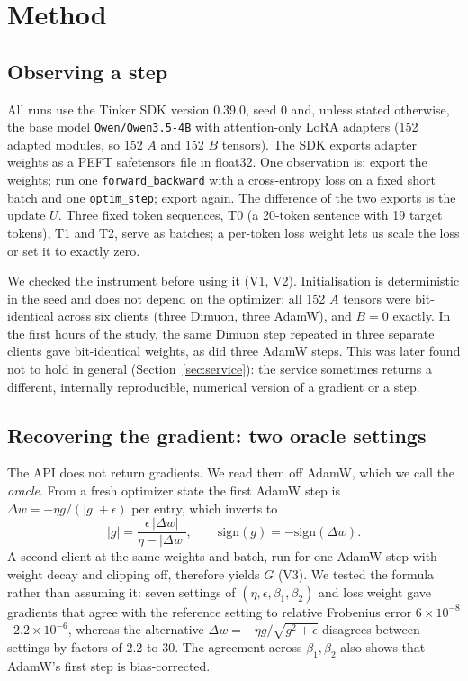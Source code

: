 \documentclass[11pt]{article}
\begin{document}
\section{Method}\label{sec:method}

\subsection{Observing a step}
All runs use the Tinker SDK version 0.39.0, seed 0 and, unless stated otherwise, the base model
\texttt{Qwen/Qwen3.5-4B} with attention-only LoRA adapters (152 adapted modules, so 152 $A$ and 152
$B$ tensors). The SDK exports adapter weights as a PEFT safetensors file in float32. One observation
is: export the weights; run one \texttt{forward\_backward} with a cross-entropy loss on a fixed
short batch and one \texttt{optim\_step}; export again. The difference of the two exports is the
update $U$. Three fixed token sequences, T0 (a 20-token sentence with 19 target tokens), T1 and T2,
serve as batches; a per-token loss weight lets us scale the loss or set it to exactly zero.

We checked the instrument before using it (V1, V2). Initialisation is deterministic in the seed and
does not depend on the optimizer: all 152 $A$ tensors were bit-identical across six clients (three
Dimuon, three AdamW), and $B=0$ exactly. In the first hours of the study, the same Dimuon step
repeated in three separate clients gave bit-identical weights, as did three AdamW steps. This was
later found not to hold in general (Section~\ref{sec:service}): the service sometimes returns a
different, internally reproducible, numerical version of a gradient or a step.

\subsection{Recovering the gradient: two oracle settings}\label{sec:oracle}
The API does not return gradients. We read them off AdamW, which we call the \emph{oracle}. From a
fresh optimizer state the first AdamW step is $\Delta w=-\eta g/(|g|+\epsilon)$ per entry, which
inverts to
\[
|g|=\frac{\epsilon\,|\Delta w|}{\eta-|\Delta w|},\qquad \mathrm{sign}(g)=-\mathrm{sign}(\Delta w).
\]
A second client at the same weights and batch, run for one AdamW step with weight decay and clipping
off, therefore yields $G$ (V3). We tested the formula rather than assuming it: seven settings of
$(\eta,\epsilon,\beta_1,\beta_2)$ and loss weight gave gradients that agree with the reference
setting to relative Frobenius error $6\times10^{-8}$--$2.2\times10^{-6}$, whereas the alternative
$\Delta w=-\eta g/\sqrt{g^2+\epsilon}$ disagrees between settings by factors of 2.2 to 30. The
agreement across $\beta_1,\beta_2$ also shows that AdamW's first step is bias-corrected.
\end{document}
